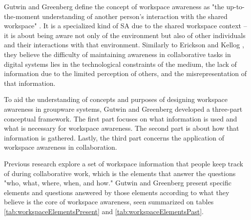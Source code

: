     Gutwin and Greenberg \cite{gutwinDescriptiveFrameworkWorkspace2002} define the concept of workspace awareness as "the up-to-the-moment understanding of another person's interaction with the shared workspace" \cite{gutwinDescriptiveFrameworkWorkspace2002}. It is a specialized kind of SA due to the shared workspace context -- it is about being aware not only of the environment but also of other individuals and their interactions with that environment. Similarly to Erickson and Kellog \cite{ericksonSocialTranslucenceApproach2000}, they believe the difficulty of maintaining awareness in collaborative tasks in digital systems lies in the technological constraints of the medium, the lack of information due to the limited perception of others, and the misrepresentation of that information.

    To aid the understanding of concepts and purposes of designing workspace awareness in groupware systems, Gutwin and Greenberg \cite{gutwinDescriptiveFrameworkWorkspace2002} developed a three-part conceptual framework. The first part focuses on what information is used and what is necessary for workspace awareness. The second part is about how that information is gathered. Lastly, the third part concerns the application of workspace awareness in collaboration.

    Previous research \cite{dourishAwarenessCoordinationShared1992, sohlenkampIntegratingCommunicationCooperation1994, mcdanielAwarenessCollaborativeSystems1997, gutwinDescriptiveFrameworkWorkspace2002} explore a set of workspace information that people keep track of during collaborative work, which is the elements that answer the questions "who, what, where, when, and how." Gutwin and Greenberg \cite{gutwinDescriptiveFrameworkWorkspace2002} present specific elements and questions answered by those elements according to what they believe is the core of workspace awareness, seen summarized on tables \ref{tab:workspaceElementsPresent} and \ref{tab:workspaceElementsPast}.

